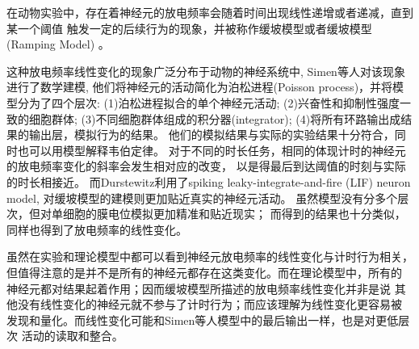 
在动物实验中，存在着神经元的放电频率会随着时间出现线性递增或者递减，直到某一个阈值
触发一定的后续行为的现象，并被称作缓坡模型或者缓坡模型(Ramping Model)
。

这种放电频率线性变化的现象广泛分布于动物的神经系统中,
Simen等人对该现象进行了数学建模,
他们将神经元的活动简化为泊松进程(Poisson process)，并将模型分为了四个层次:
(1)泊松进程拟合的单个神经元活动; (2)兴奋性和抑制性强度一致的细胞群体;
(3)不同细胞群体组成的积分器(integrator); (4)将所有环路输出成结果的输出层，模拟行为的结果。
他们的模拟结果与实际的实验结果十分符合，同时也可以用模型解释韦伯定律。
对于不同的时长任务，相同的体现计时的神经元的放电频率变化的斜率会发生相对应的改变，
以是得最后到达阈值的时刻与实际的时长相接近。
而Durstewitz利用了spiking leaky-integrate-and-fire (LIF) neuron model,
对缓坡模型的建模则更加贴近真实的神经元活动。
虽然模型没有分多个层次，但对单细胞的膜电位模拟更加精准和贴近现实；
而得到的结果也十分类似，同样也得到了放电频率的线性变化。

虽然在实验和理论模型中都可以看到神经元放电频率的线性变化与计时行为相关，
但值得注意的是并不是所有的神经元都存在这类变化。而在理论模型中，所有的
神经元都对结果起着作用；因而缓坡模型所描述的放电频率线性变化并非是说
其他没有线性变化的神经元就不参与了计时行为；而应该理解为线性变化更容易被
发现和量化。而线性变化可能和Simen等人模型中的最后输出一样，也是对更低层次
活动的读取和整合。
